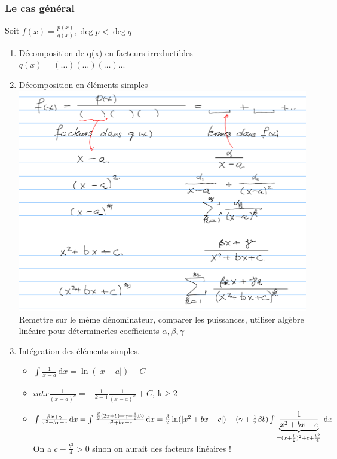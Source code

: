 \documentclass[12pt,a4paper]{article}
\newcommand{\intx}[3]{\ensuremath{\int_{#1}^{#2} #3 \, \mathrm dx}}
\begin{document}
{\subsubsection{Le cas général}
Soit $f(x) = \frac{p(x)}{q(x)}, \deg p < \deg q$
\begin{enumerate}
	\item Décomposition de q(x) en facteurs irreductibles \\
	$q(x) = (\ldots)(\ldots)(\ldots)...$
	\item Décomposition en éléments simples \\
	\includegraphics[scale=0.5]{Illustrations_Analyse/elements_simples}\\
	Remettre sur le même dénominateur, comparer les puissances, utiliser algèbre linéaire pour déterminerles coefficients $\alpha,\beta,\gamma$
	\item Intégration des éléments simples.
	\begin{itemize}
		\item $\intx{}{}{\frac{1}{x-a}} = \ln(|x-a|) + C$
		\item $intx{}{}{\frac{1}{(x-a)^k}} = -\frac{1}{k-1}\frac{1}{(x-a)^k} + C$, k$\geq 2$
		\item $\intx{}{}{\frac{\beta x + \gamma}{x^2+bx+c}} = \intx{}{}{\frac{\frac{\beta}{2}(2x+b)+\gamma - \frac{1}{2}\beta b}{x^2+bx +c}} \\
		= \frac{\beta}{2} \ln(|x^2+bx+c|) + (\gamma+ \frac{1}{2}\beta b)\intx{}{}{\underbrace{\frac{1}{x^2+bx+c}}_{=(x+\frac{b}{2})^2+c+\frac{b^2}{4}}}$\\
		On a $c - \frac{b^2}{4} > 0$ sinon on aurait des facteurs linéaires !\\

\end{itemize}
\end{enumerate}}
\end{document}
